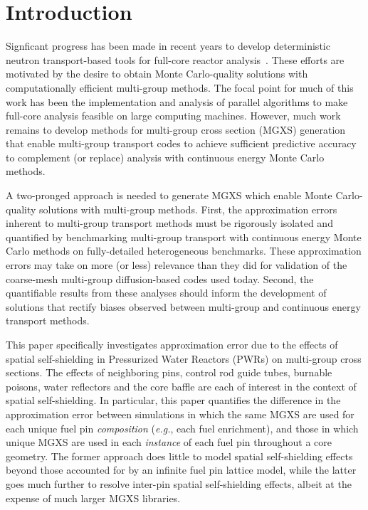 \section{Introduction}
\label{sec:intro}

Signficant progress has been made in recent years to develop deterministic neutron transport-based tools for full-core reactor analysis~\citep{gunow20173dmoc, ryu2015solution, kochunas2013overview, evans2010denovo, palmiotti2007unic}. These efforts are motivated by the desire to obtain Monte Carlo-quality solutions with computationally efficient multi-group methods. The focal point for much of this work has been the implementation and analysis of parallel algorithms to make full-core analysis feasible on large computing machines. However, much work remains to develop methods for multi-group cross section (MGXS) generation that enable multi-group transport codes to achieve sufficient predictive accuracy to complement (or replace) analysis with continuous energy Monte Carlo methods.

A two-pronged approach is needed to generate MGXS which enable Monte Carlo-quality solutions with multi-group methods. First, the approximation errors inherent to multi-group transport methods must be rigorously isolated and quantified by benchmarking multi-group transport with continuous energy Monte Carlo methods on fully-detailed heterogeneous benchmarks. These approximation errors may take on more (or less) relevance than they did for validation of the coarse-mesh multi-group diffusion-based codes used today. Second, the quantifiable results from these analyses should inform the development of solutions that rectify biases observed between multi-group and continuous energy transport methods.

This paper specifically investigates approximation error due to the effects of spatial self-shielding in Pressurized Water Reactors (PWRs) on multi-group cross sections. The effects of neighboring pins, control rod guide tubes, burnable poisons, water reflectors and the core baffle are each of interest in the context of spatial self-shielding. In particular, this paper quantifies the difference in the approximation error between simulations in which the same MGXS are used for each unique fuel pin \textit{composition} (\textit{e.g.}, each fuel enrichment), and those in which unique MGXS are used in each \textit{instance} of each fuel pin throughout a core geometry. The former approach does little to model spatial self-shielding effects beyond those accounted for by an infinite fuel pin lattice model, while the latter goes much further to resolve inter-pin spatial self-shielding effects, albeit at the expense of much larger MGXS libraries.

